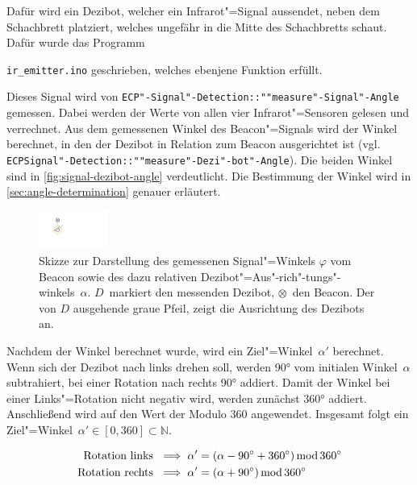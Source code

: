 Dafür wird ein Dezibot, welcher ein Infrarot"=Signal aussendet, neben dem Schachbrett platziert, welches ungefähr in die Mitte des Schachbretts schaut. Dafür wurde das Programm {\texttt{ir\_emitter.ino} geschrieben, welches ebenjene Funktion erfüllt.

Dieses Signal wird von \texttt{ECP"-Signal"-Detection::""measure"-Signal"-Angle} gemessen. Dabei werden der Werte von allen vier Infrarot"=Sensoren gelesen und verrechnet. Aus dem gemessenen Winkel des Beacon"=Signals wird der Winkel berechnet, in den der Dezibot in Relation zum Beacon ausgerichtet ist (vgl. \texttt{ECPSignal"-Detection::""measure"-Dezi"-bot"-Angle}). Die beiden Winkel sind in \autoref{fig:signal-dezibot-angle} verdeutlicht. Die Bestimmung der Winkel wird in \autoref{sec:angle-determination} genauer erläutert.

\begin{figure}[h]
    \centering
    \includegraphics[width=0.2\textwidth]{../assets/signal_dezibot_angle.pdf}
    \caption{Skizze zur Darstellung des gemessenen Signal"=Winkels $\varphi$ vom Beacon sowie des dazu relativen Dezibot"=Aus"-rich"-tungs"-winkels~$\alpha$. $D$~markiert den messenden Dezibot, $\otimes$~den Beacon. Der von $D$ ausgehende graue Pfeil, zeigt die Ausrichtung des Dezibots an.}
    \label{fig:signal-dezibot-angle}
\end{figure}

Nachdem der Winkel berechnet wurde, wird ein Ziel"=Winkel~$\alpha'$ berechnet. Wenn sich der Dezibot nach links drehen soll, werden 90° vom initialen Winkel~$\alpha$ subtrahiert, bei einer Rotation nach rechts 90° addiert. Damit der Winkel bei einer Links"=Rotation nicht negativ wird, werden zunächst 360° addiert. Anschließend wird auf den Wert der Modulo 360 angewendet. Insgesamt folgt ein Ziel"=Winkel~$\alpha' \in [0,360] \subset \mathbb{N}$.

\begin{equation*}
\begin{aligned}
    \text{Rotation links } &\implies \alpha' = (\alpha - 90^\circ + 360^\circ) \operatorname{mod} 360^\circ \\
    \text{Rotation rechts } &\implies \alpha' = (\alpha + 90^\circ) \operatorname{mod} 360^\circ
\end{aligned}
\end{equation*}

}
